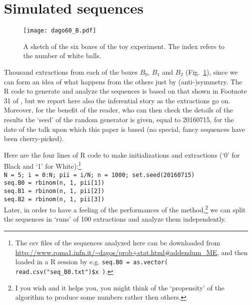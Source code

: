\documentclass[11pt]{article}
\begin{document}
\section{Simulated sequences}
\begin{figure}
\centerline{\texttt{[image: dago60\_B.pdf]}}
\mbox{}\vspace{-0.3cm}
\caption{\small \sf A sketch of the six boxes of the toy experiment.
The index refers to the number of white balls.}
\label{fig:sixbox}
\end{figure}
Thousand extractions from each 
of the  boxes $B_0$, $B_1$ and $B_2$
(Fig.~\ref{fig:sixbox}), since we can form an idea
of what happens from the others just by (anti-)symmetry. 
The R code to generate and analyze the sequences 
is based on that shown in Footnote 31
of \cite{ME2016}, but we report here also the 
inferential story as the  extractions go on. 
Moreover, for the benefit of the reader, 
who can then check the details of the
results the `seed' of the random generator is given,
equal to 20160715, for the date of the talk upon which
this paper is based (no special, fancy sequences have been
cherry-picked).

Here are the four lines of R code to make initializations 
and extractions (`0' for Black and `1' for
 White):\footnote{The csv files of the sequences analyzed here
can be downloaded from 
\url{http://www.roma1.infn.it/~dagos/prob+stat.html#addendum_ME}, 
and then loaded in a R session 
by e.g. \verb|seq.B0 = as.vector( read.csv("seq_B0.txt")$x )|.
}\\
\verb|N = 5; i = 0:N; pii = i/N; n = 1000; set.seed(20160715)|\\
\verb|seq.B0 = rbinom(n, 1, pii[1])|\\
\verb|seq.B1 = rbinom(n, 1, pii[2])|\\
\verb|seq.B2 = rbinom(n, 1, pii[3])|\\
Later, in order to have a feeling of the performances
of the method,\footnote{I you wish and it helps you, 
you might think of the `propensity' \cite{ME2016} of the algorithm 
to produce some numbers rather then others.}
we can split the sequences in `runs' of 100 extractions
and analyze them independently. 
\end{document}
